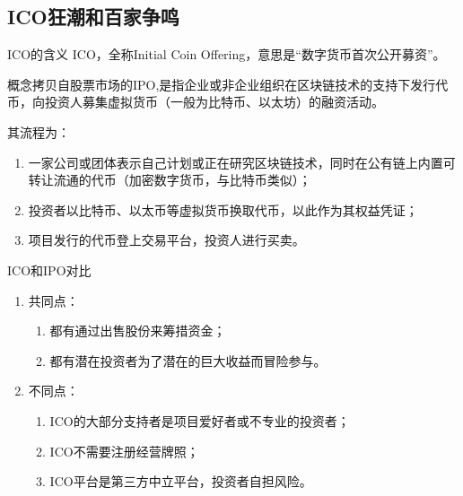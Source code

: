 \documentclass[11pt]{beamer}
\begin{document}
\subsection{ICO狂潮和百家争鸣}
\begin{frame}{ICO的含义}
	ICO，全称Initial Coin Offering，意思是“数字货币首次公开募资”。
	
	概念拷贝自股票市场的IPO,是指企业或非企业组织在区块链技术的支持下发行代币，向投资人募集虚拟货币（一般为比特币、以太坊）的融资活动。
	
	其流程为：
	\begin{enumerate}
		\item 一家公司或团体表示自己计划或正在研究区块链技术，同时在公有链上内置可转让流通的代币（加密数字货币，与比特币类似）；
		\item 投资者以比特币、以太币等虚拟货币换取代币，以此作为其权益凭证；
		\item 项目发行的代币登上交易平台，投资人进行买卖。
	\end{enumerate}
\end{frame}

\begin{frame}{ICO和IPO对比}
	\begin{enumerate}
	\item 共同点：
	\begin{enumerate}
		\item 都有通过出售股份来筹措资金；
		
		\item 都有潜在投资者为了潜在的巨大收益而冒险参与。
		
	\end{enumerate}
		
	\item 不同点：
		\begin{enumerate}
\item 	ICO的大部分支持者是项目爱好者或不专业的投资者；
	
	\item ICO不需要注册经营牌照；
	
\item 	ICO平台是第三方中立平台，投资者自担风险。
		\end{enumerate}
	\end{enumerate}
\end{frame}
\end{document}
